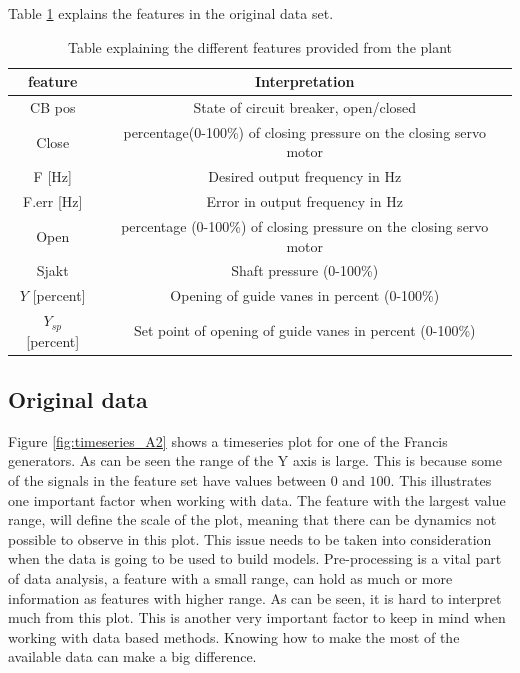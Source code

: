     
    Table \ref{tab:variables} explains the features in the original data set.
    \begin{table}[h]
        \centering
        \begin{tabular}{|c|c|}
             \hline
             \textbf{feature} & \textbf{Interpretation}  \\ \hline
             CB pos & State of circuit breaker, open/closed  \\ \hline 
             Close & percentage(0-100\%) of closing pressure on the closing servo motor \\ \hline 
             F [Hz] & Desired output frequency in Hz \\ \hline
             F.err [Hz] & Error in output frequency in Hz \\ \hline
             Open & percentage (0-100\%) of closing pressure on the closing servo motor \\ \hline
             Sjakt & Shaft pressure (0-100\%)\\ \hline
             $Y$ [percent] & Opening of guide vanes in percent (0-100\%)\\ \hline
             $Y_{sp}$ [percent] &  Set point of opening of guide vanes in percent (0-100\%)\\ \hline
             
        \end{tabular}
        
        \caption{Table explaining the different features provided from the plant}
        \label{tab:variables}
    \end{table}
    
    
    \subsection{Original data}
        Figure \ref{fig:timeseries_A2} shows a timeseries plot  for one of the Francis generators. As can be seen the range of the Y axis is large. This is because some of the signals in the feature set have values between $0$ and $100$. This illustrates one important factor when working with data. The feature with the largest value range, will define the scale of the plot, meaning that there can be dynamics not possible to observe in this plot. This issue needs to be taken into consideration when the data is going to be used to build models. Pre-processing is a vital part of data analysis, a feature with a small range, can hold as much or more information as features with higher range. As can be seen, it is hard to interpret much from this plot. This is another very important factor to keep in mind when working with data based methods. Knowing how to make the most of the available data can make a big difference.  
        
